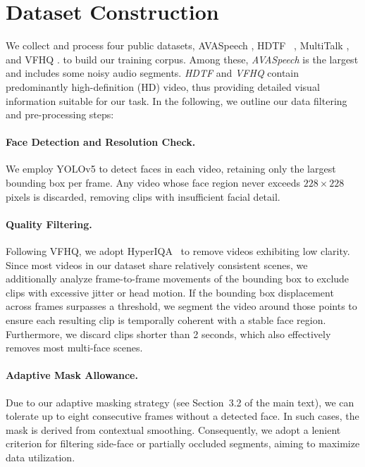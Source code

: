 \clearpage
\appendix

\section{Dataset Construction}

We collect and process four public datasets, AVASpeech \citep{chaudhuri2018ava}, HDTF ~\citep{zhang2021flow}, MultiTalk \citep{sung2024multitalk}, and VFHQ \citep{wang2022vfhq}. to build our training corpus. 
Among these, \emph{AVASpeech} is the largest and includes some noisy audio segments. 
\emph{HDTF} and \emph{VFHQ} contain predominantly high-definition (HD) video, thus providing detailed visual information suitable for our task. 
In the following, we outline our data filtering and pre-processing steps:
\vspace{-0.3cm}
\paragraph{Face Detection and Resolution Check.}
We employ YOLOv5 to detect faces in each video, retaining only the largest bounding box per frame. 
Any video whose face region never exceeds $228\times228$ pixels is discarded, removing clips with insufficient facial detail.
\vspace{-0.3cm}
\paragraph{Quality Filtering.}
Following VFHQ, we adopt HyperIQA~\citep{9156687} to remove videos exhibiting low clarity. 
Since most videos in our dataset share relatively consistent scenes, we additionally analyze frame-to-frame movements of the bounding box to exclude clips with excessive jitter or head motion. 
If the bounding box displacement across frames surpasses a threshold, we segment the video around those points to ensure each resulting clip is temporally coherent with a stable face region. 
Furthermore, we discard clips shorter than 2 seconds, which also effectively removes most multi-face scenes.
\vspace{-0.3cm}
\paragraph{Adaptive Mask Allowance.}
Due to our adaptive masking strategy (see Section~3.2 of the main text), we can tolerate up to eight consecutive frames without a detected face. 
In such cases, the mask is derived from contextual smoothing. 
Consequently, we adopt a lenient criterion for filtering side-face or partially occluded segments, aiming to maximize data utilization.
\vspace{-0.3cm}
